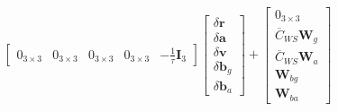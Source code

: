 \documentclass[a4paper,11pt,notitlepage]{article}
\begin{document}
\begin{equation}
\begin{bmatrix}
       0_{3 \times 3} & 0_{3 \times 3} 
       & 0_{3 \times 3} &  0_{3 \times 3} &  -\frac{1}{\tau}\textbf{I}_{3}
\end{bmatrix}
\begin{bmatrix}
       \delta \textbf{r}  \\[0.3em]
       \delta \textbf{a} \\[0.3em]
       \delta \textbf{v} \\[0.3em]
       \delta \textbf{b}_{g} \\[0.3em]
       \delta \textbf{b}_{a}
\end{bmatrix}
+
\begin{bmatrix}
       0_{3 \times 3}  \\[0.3em]
       \overline{C}_{WS} \textbf{W}_{g} \\[0.3em]
       \overline{C}_{WS} \textbf{W}_{a} \\[0.3em]
       \textbf{W}_{bg} \\[0.3em]
       \textbf{W}_{ba}
\end{bmatrix}
\end{equation}



\newpage


\end{document}
